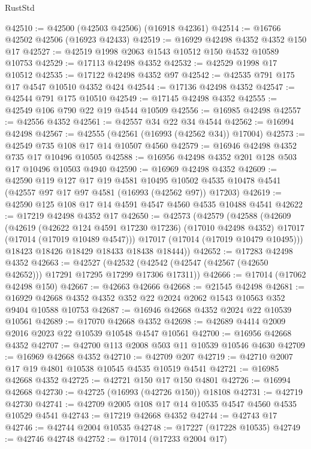 \begin{lexlean}{RustStd}
\begin{coremodule}
{\begin{coremodule}
{{{{{{{{{{{{{{{{{{{{{{{{{{{{{{{{{{{{{{{{{{{{{{{{{{{{{{{@42510 := @42500 (@42503 @42506) (@16918 @42361)
@42514 := @16766 @42502 @42506 (@16923 @42433)
@42519 := @16929 @42498 @4352 @4352 @150 @17
@42527 := @42519 @1998 @2063 @1543 @10512 @150 @4532 @10589 @10753
@42529 := @17113 @42498 @4352
@42532 := @42529 @1998 @17 @10512
@42535 := @17122 @42498 @4352 @97
@42542 := @42535 @791 @175 @17 @4547 @10510 @4352 @424
@42544 := @17136 @42498 @4352
@42547 := @42544 @791 @175 @10510
@42549 := @17145 @42498 @4352
@42555 := @42549 @106 @790 @22 @19 @4544 @10509
@42556 := @16985 @42498
@42557 := @42556 @4352
@42561 := @42557 @34 @22 @34 @4544
@42562 := @16994 @42498
@42567 := @42555 (@42561 (@16993 (@42562 @34)) @17004)
@42573 := @42549 @735 @108 @17 @14 @10507 @4560
@42579 := @16946 @42498 @4352 @735 @17 @10496 @10505
@42588 := @16956 @42498 @4352 @201 @128 @503 @17 @10496 @10503 @4940
@42590 := @16969 @42498 @4352
@42609 := @42590
    @119
    @127
    @17
    @19
    @4581
    @10495
    @10502
    @4535
    @10478
    @4541
    (@42557 @97 @17 @97 @4581 (@16993 (@42562 @97)) @17203)
@42619 := @42590 @125 @108 @17 @14 @4591 @4547 @4560 @4535 @10488 @4541
@42622 := @17219 @42498 @4352 @17
@42650 := @42573
    (@42579
      (@42588
        (@42609
          (@42619
            (@42622 @124 @4591 @17230 @17236)
            (@17010 @42498 @4352)
            @17017
            (@17014 (@17019 @10489 @4547)))
          @17017
          (@17014 (@17019 @10479 @10495)))
        @18423
        @18426
        @18429
        @18433
        @18438
        @18444))
@42652 := @17283 @42498 @4352
@42663 := @42527
    (@42532 (@42542 (@42547 (@42567 (@42650 @42652))) @17291 @17295 @17299 @17306 @17311))
@42666 := @17014 (@17062 @42498 @150)
@42667 := @42663 @42666
@42668 := @21545 @42498
@42681 := @16929 @42668 @4352 @4352 @352 @22 @2024 @2062 @1543 @10563 @352 @9404 @10588 @10753
@42687 := @16946 @42668 @4352 @2024 @22 @10539 @10561
@42689 := @17070 @42668 @4352
@42698 := @42689 @4414 @2009 @2016 @2023 @22 @10539 @10548 @4547 @10561
@42700 := @16956 @42668 @4352
@42707 := @42700 @113 @2008 @503 @11 @10539 @10546 @4630
@42709 := @16969 @42668 @4352
@42710 := @42709 @207
@42719 := @42710 @2007 @17 @19 @4801 @10538 @10545 @4535 @10519 @4541
@42721 := @16985 @42668 @4352
@42725 := @42721 @150 @17 @150 @4801
@42726 := @16994 @42668
@42730 := @42725 (@16993 (@42726 @150)) @18108
@42731 := @42719 @42730
@42741 := @42709 @2005 @108 @17 @14 @10535 @4547 @4560 @4535 @10529 @4541
@42743 := @17219 @42668 @4352
@42744 := @42743 @17
@42746 := @42744 @2004 @10535
@42748 := @17227 (@17228 @10535)
@42749 := @42746 @42748
@42752 := @17014 (@17233 @2004 @17)
}}}}}}}}}}}}}}}}}}}}}}}}}}}}}}}}}}}}}}}}}}}}}}}}}}}}}}}
\end{coremodule}}
\end{coremodule}
\end{lexlean}
